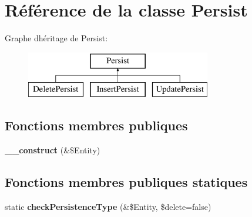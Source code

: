 \hypertarget{class_o_r_m_1_1_persistence_1_1_persist}{}\section{Référence de la classe Persist}
\label{class_o_r_m_1_1_persistence_1_1_persist}
Graphe d\textquotesingle{}héritage de Persist\+:\begin{figure}[H]
\begin{center}
\leavevmode
\includegraphics[height=2.000000cm]{class_o_r_m_1_1_persistence_1_1_persist}
\end{center}
\end{figure}
\subsection*{Fonctions membres publiques}
\begin{DoxyCompactItemize}
\item 
{\bfseries \+\_\+\+\_\+construct} (\&\$Entity)\hypertarget{class_o_r_m_1_1_persistence_1_1_persist_a350243d37d157f4d93a480d3bb4b5e36}{}\label{class_o_r_m_1_1_persistence_1_1_persist_a350243d37d157f4d93a480d3bb4b5e36}

\end{DoxyCompactItemize}
\subsection*{Fonctions membres publiques statiques}
\begin{DoxyCompactItemize}
\item 
static {\bfseries check\+Persistence\+Type} (\&\$Entity, \$delete=false)\hypertarget{class_o_r_m_1_1_persistence_1_1_persist_a916b06f2fdb54cb4345febe0f3e814e5}{}\label{class_o_r_m_1_1_persistence_1_1_persist_a916b06f2fdb54cb4345febe0f3e814e5}

\end{DoxyCompactItemize}
